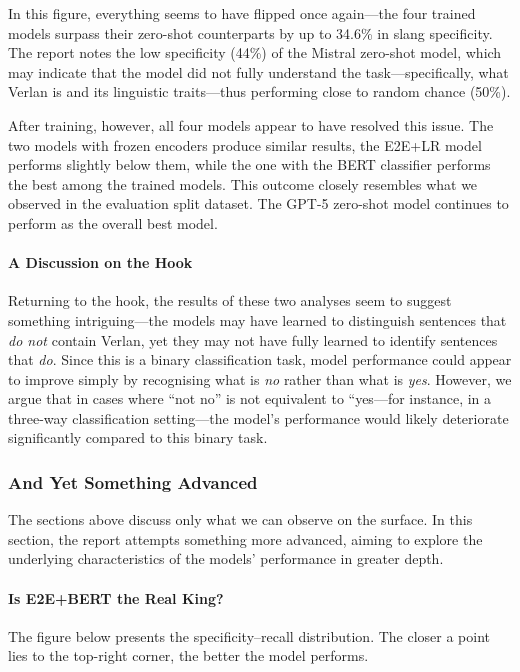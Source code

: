 \documentclass[12pt]{article}
\begin{document}
In this figure, everything seems to have flipped once again\;---\;the four trained models surpass their zero-shot counterparts by up to 34.6\% in slang specificity. 
The report notes the low specificity (44\%) of the Mistral zero-shot model, which may indicate that the model did not fully understand the task\;---\;specifically, what Verlan is and its linguistic traits\;---\;thus performing close to random chance (50\%).

After training, however, all four models appear to have resolved this issue. 
The two models with frozen encoders produce similar results, the E2E+LR model performs slightly below them, while the one with the BERT classifier performs the best among the trained models. 
This outcome closely resembles what we observed in the evaluation split dataset. 
The GPT-5 zero-shot model continues to perform as the overall best model.

\paragraph{A Discussion on the Hook}
Returning to the hook, the results of these two analyses seem to suggest something intriguing\;---\;the models may have learned to distinguish sentences that \textit{do not} contain Verlan, yet they may not have fully learned to identify sentences that \textit{do}. 
Since this is a binary classification task, model performance could appear to improve simply by recognising what is \textit{no} rather than what is \textit{yes}. 
However, we argue that in cases where “not no” is not equivalent to “yes\;---\;for instance, in a three-way classification setting\;---\;the model's performance would likely deteriorate significantly compared to this binary task.

\subsubsection{And Yet Something Advanced}

The sections above discuss only what we can observe on the surface. 
In this section, the report attempts something more advanced, aiming to explore the underlying characteristics of the models' performance in greater depth.

\paragraph{Is E2E+BERT the Real King?}

The figure below presents the specificity--recall distribution. 
The closer a point lies to the top-right corner, the better the model performs.
\end{document}
